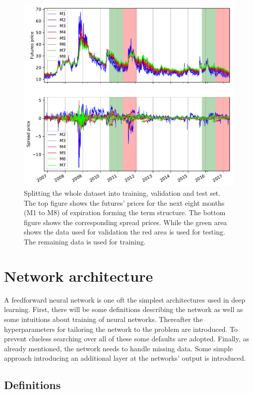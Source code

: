 \begin{figure}
	\centering
	\includegraphics[width=0.9\linewidth]{images/validation-and-test-set}
	\caption[Splitting whole dataset into training, validation and test set]{Splitting the whole dataset into training, validation and test set. The top figure shows the futures' prices for the next eight months (M1 to M8) of expiration forming the term structure. The bottom figure shows the corresponding spread prices. While the green area shows the data used for validation the red area is used for testing. The remaining data is used for training.}
	\label{fig:validation-and-test-set}
\end{figure}


\section{Network architecture}
\label{sec:aao-network-architecture}

A feedforward neural network is one oft the simplest architectures used in deep learning. First, there will be some definitions describing the network as well as some intuitions about training of neural networks. Thereafter the hyperparameters for tailoring the network to the problem are introduced. To prevent clueless searching over all of these some defaults are adopted. Finally, as already mentioned, the network needs to handle missing data. Some simple approach introducing an additional layer at the networks' output is introduced.

\subsection{Definitions}

